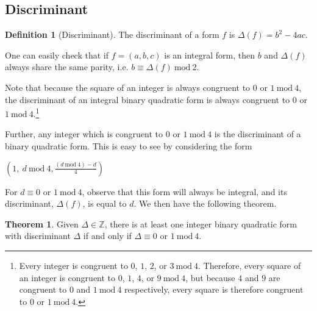 \documentclass{article}
\theoremstyle{definition}
\newtheorem{definition}{Definition}[section]
\theoremstyle{theorem}
\newtheorem{theorem}{Theorem}[section]
\theoremstyle{example}
\theoremstyle{corollary}
\begin{document}
\bigskip

\subsection{Discriminant}

\bigskip

\theoremstyle{definition}
\begin{definition}[Discriminant]
The discriminant of a form \(f\) is \(\Delta(f) = b^{2} - 4ac\).
\end{definition}

\bigskip

One can easily check that if \(f = (a, b, c)\) is an integral form, then \(b\) and \(\Delta(f)\) always share the same parity, i.e. \(b \equiv \Delta(f) \ \textrm{mod} \ 2\).

\bigskip

Note that because the square of an integer is always congruent to \(0\) or \(1 \ \textrm{mod} \ 4\), the discriminant of an integral binary quadratic form is always congruent to \(0\) or \(1 \ \textrm{mod} \ 4\).\footnote{Every integer is congruent to \(0\), \(1\), \(2\), or \(3 \ \textrm{mod} \ 4\). Therefore, every square of an integer is congruent to \(0\), \(1\), \(4\), or \(9 \ \textrm{mod} \ 4\), but because \(4\) and \(9\) are congruent to \(0\) and \(1 \ \textrm{mod} \ 4\) respectively, every square is therefore congruent to \(0\) or \(1 \ \textrm{mod} \ 4\).}

\bigskip

Further, any integer which is congruent to \(0\) or \(1 \ \textrm{mod} \ 4\) is the discriminant of a binary quadratic form. This is easy to see by considering the form
\begin{center}
\(\left(1,\ d \ \textrm{mod} \ 4, \frac{(d \ \textrm{mod} \ 4) - d}{4}\right)\)
\end{center}

\bigskip

For \(d \equiv 0\) or \(1 \ \textrm{mod} \ 4\), observe that this form will always be integral, and its discriminant, \(\Delta(f)\), is equal to \(d\). We then have the following theorem.

\bigskip

\theoremstyle{theorem}
\begin{theorem}
Given \(\Delta \in \mathbb{Z}\), there is at least one integer binary quadratic form with discriminant \(\Delta\) if and only if \(\Delta \equiv 0\) or \(1 \ \textrm{mod} \ 4\).
\end{theorem}
\end{document}
